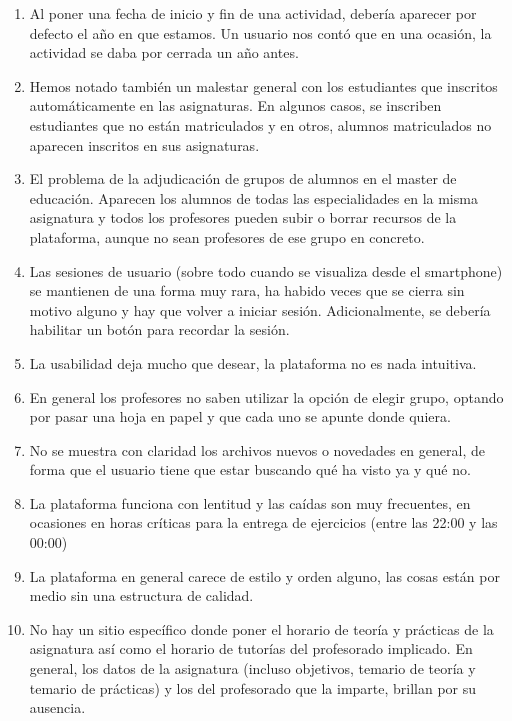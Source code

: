 \begin{enumerate}
\item Al poner una fecha de inicio y fin de una actividad, debería aparecer por defecto el año en que estamos. Un usuario nos contó que en una ocasión, la actividad se daba por cerrada un año antes.

\item Hemos notado también un malestar general con los estudiantes que inscritos automáticamente en las asignaturas. En algunos casos, se inscriben estudiantes que no están matriculados y en otros, alumnos matriculados no aparecen inscritos en sus asignaturas.

\item El problema de la adjudicación de grupos de alumnos en el master de educación. Aparecen los alumnos de todas las especialidades en la misma asignatura y todos los profesores pueden subir o borrar recursos de la plataforma, aunque no sean profesores de ese grupo en concreto.


\item Las sesiones de usuario (sobre todo cuando se visualiza desde el smartphone) se mantienen de una forma muy rara, ha habido veces que se cierra sin motivo alguno y hay que volver a iniciar sesión. Adicionalmente, se debería habilitar un botón para recordar la sesión.

\item La usabilidad deja mucho que desear, la plataforma no es nada intuitiva.

\item En general los profesores no saben utilizar la opción de elegir grupo, optando por pasar una hoja en papel y que cada uno se apunte donde quiera.

\item No se muestra con claridad los archivos nuevos o novedades en general, de forma que el usuario tiene que estar buscando qué ha visto ya y qué no.

\item La plataforma funciona con lentitud y las caídas son muy frecuentes, en ocasiones en horas críticas para la entrega de ejercicios (entre las 22:00 y las 00:00)

\item La plataforma en general carece de estilo y orden alguno, las cosas están por medio sin una estructura de calidad.

\item No hay un sitio específico donde poner el horario de teoría y prácticas de la asignatura así como el horario de tutorías del profesorado implicado. En general, los datos de la asignatura (incluso objetivos, temario de teoría y temario de prácticas) y los del profesorado que la imparte, brillan por su ausencia.

\end{enumerate}


